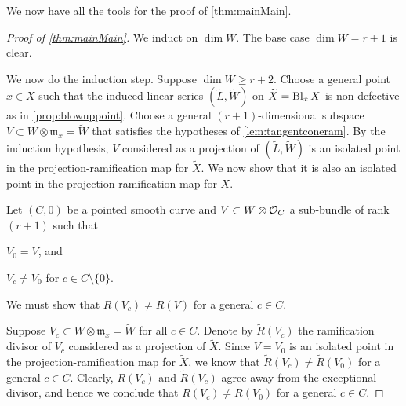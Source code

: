 We now have all the tools for the proof of \autoref{thm:mainMain}. 
\begin{proof}[Proof of \autoref{thm:mainMain}]
  We induct on $\dim W$.
  The base case $\dim W = r+1$ is clear.

  We now do the induction step.
  Suppose $\dim W \geq r+2$.
  Choose a general point $x \in X$ such that the induced linear series $(\widetilde L, \widetilde W)$ on $\widetilde X = \operatorname{Bl}_x X$ is non-defective as in \autoref{prop:blowuppoint}.
  Choose a general $(r+1)$-dimensional subspace $V \subset W \otimes \mathfrak m_x = \widetilde W$ that satisfies the hypotheses of \autoref{lem:tangentconeram}.
  By the induction hypothesis, $V$ considered as a projection of $(\widetilde L, \widetilde W)$ is an isolated point in the projection-ramification map for $\widetilde X$.
  We now show that it is also an isolated point in the projection-ramification map for $X$.

  Let $(C, 0)$ be a pointed smooth curve and $V \subset W \otimes \mathcal O_C$ a sub-bundle of rank $(r+1)$ such that
  \begin{inparaenum}
  \item $V_{0} = V$, and 
  \item $V_{c} \neq V_{0}$ for $c \in C \setminus \{0\}$.
  \end{inparaenum}
  We must show that $R(V_c) \neq R(V)$ for a general $c \in C$.

  Suppose $V_c \subset W \otimes \mathfrak m_x = \widetilde W$ for all $c \in C$.
  Denote by $\widetilde R(V_c)$ the ramification divisor of $V_c$ considered as a projection of $\widetilde X$.
  Since $V = V_0$ is an isolated point in the projection-ramification map for $\widetilde X$, we know that $\widetilde R(V_c) \neq \widetilde R(V_0)$ for a general $c \in C$.
  Clearly, $R(V_c)$ and $\widetilde R(V_c)$ agree away from the exceptional divisor, and hence we conclude that $R(V_c) \neq R(V_0)$ for a general $c \in C$.


\end{proof}
